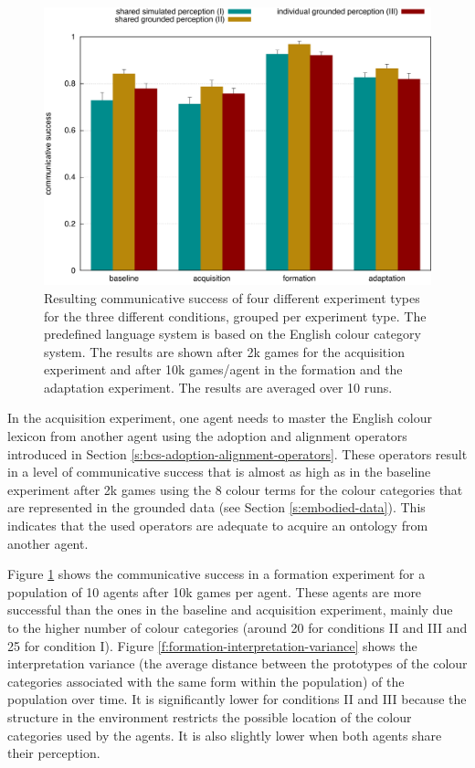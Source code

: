 \begin{figure}[htbp]
\begin{center}
\includegraphics[width=.8\textwidth]{./experiments/figures/grounding-comparison-communicative-success.pdf}
\caption[Communicative success in three different conditions for four
types of experiments]{Resulting communicative success of four
  different experiment types for the three different conditions,
  grouped per experiment type. The predefined language system is based
  on the English colour category system. The results are shown after
  2k games for the acquisition experiment and after 10k games/agent in
  the formation and the adaptation experiment. The results are
  averaged over 10 runs.}
\label{f:comparison-communicative-success}
\end{center}
\end{figure}

In the acquisition experiment, one agent needs to master the English
colour lexicon from another agent using the adoption and alignment
operators introduced in Section
\ref{s:bcs-adoption-alignment-operators}. These operators result in a
level of communicative success that is almost as high as in the
baseline experiment after 2k games using the 8 colour terms for the
colour categories that are represented in the grounded data (see
Section \ref{s:embodied-data}). This indicates that the used operators
are adequate to acquire an ontology from another agent.

Figure \ref{f:comparison-communicative-success} shows the
communicative success in a formation experiment for a population of 10
agents after 10k games per agent. These agents are more successful
than the ones in the baseline and acquisition experiment, mainly due
to the higher number of colour categories (around 20 for conditions II
and III and 25 for condition I). Figure
\ref{f:formation-interpretation-variance} shows the interpretation
variance (the average distance between the prototypes of the colour
categories associated with the same form within the population) of the
population over time. It is significantly lower for conditions II and
III because the structure in the environment restricts the possible
location of the colour categories used by the agents. It is also
slightly lower when both agents share their perception.

